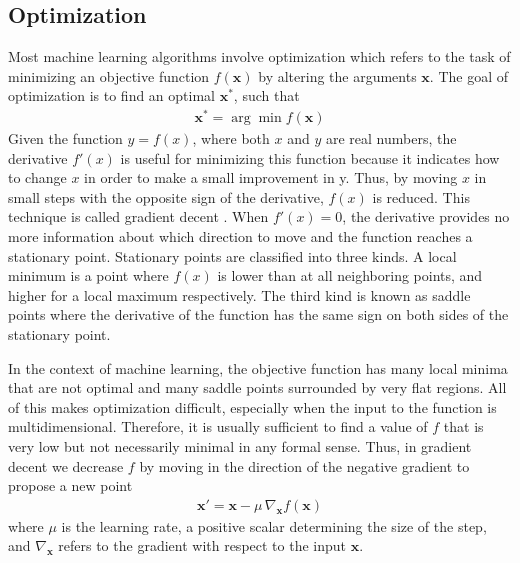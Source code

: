 \documentclass{scrartcl}
\begin{document}
\subsection{Optimization}

Most machine learning algorithms involve optimization which refers to the task of minimizing an objective function $f(\mathbf x)$ by altering the arguments $\mathbf x$. The goal of optimization is to find an optimal $\mathbf x^*$, such that
\begin{align}
\mathbf x^* = \arg \min f(\mathbf x)
\end{align} 
Given the function $y=f(x)$, where both $x$ and $y$ are real numbers, the derivative $f'(x)$ is useful for minimizing this function because it indicates how to change $x$ in order to make a small improvement in y. Thus, by moving $x$ in small steps with the opposite sign of the derivative, $f(x)$ is reduced. This technique is called gradient decent \cite{Cauchy1847}. When $f'(x)=0$, the derivative provides no more information about which direction to move and the function reaches a stationary point. Stationary points are classified into three kinds. A local minimum is a point where $f(x)$ is lower than at all neighboring points, and higher for a local maximum respectively. The third kind is known as saddle points where the derivative of the function has the same sign on both sides of the stationary point.  

In the context of machine learning, the objective function has many local minima that are not optimal and many saddle points surrounded by very flat regions. All of this makes optimization difficult, especially when the input to the function is multidimensional. Therefore, it is usually sufficient to find  a value of $f$ that is very low but not necessarily minimal in any formal sense. Thus, in gradient decent we decrease $f$ by moving in the direction of the negative gradient to propose a new point
\begin{align}
\mathbf x' = \mathbf x - \mu \,\nabla_{\mathbf x}f(\mathbf x)
\end{align} 
where $\mu$ is the learning rate, a positive scalar determining the size of the step, and $\nabla_{\mathbf x}$ refers to the gradient with respect to the input $\mathbf x$.
\end{document}
